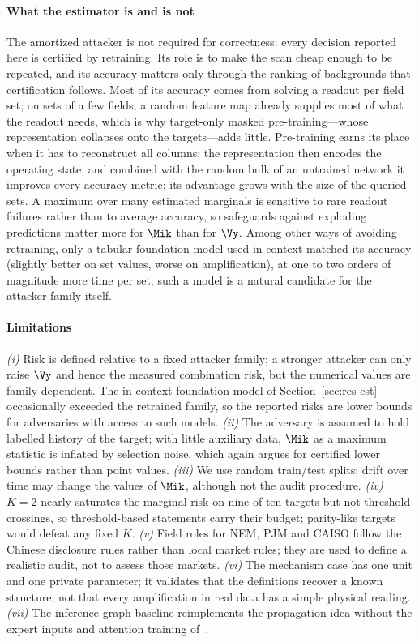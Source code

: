 \paragraph{What the estimator is and is not}
The amortized attacker is not required for correctness: every decision reported here is certified
by retraining. Its role is to make the scan cheap enough to be repeated, and its accuracy matters
only through the ranking of backgrounds that certification follows. Most of its accuracy comes from solving a readout
per field set; on sets of a few fields, a random feature map already supplies most of what the readout needs, which is
why target-only masked pre-training---whose representation collapses onto the targets---adds little. Pre-training
earns its place when it has to reconstruct all columns: the representation then encodes the operating state, and combined
with the random bulk of an untrained network it improves every accuracy metric; its advantage grows with the size of the
queried sets. A maximum over many
estimated marginals is sensitive to rare readout failures rather than to average accuracy, so safeguards against
exploding predictions matter more for $\Mik$ than for $\Vy$. Among other ways of avoiding retraining, only a tabular foundation model used in context
matched its accuracy (slightly better on set values, worse on amplification), at one to two orders of magnitude more time per set; such a model is a natural candidate for the
attacker family itself.

\paragraph{Limitations}
\emph{(i)} Risk is defined relative to a fixed attacker family; a stronger attacker can only raise
$\Vy$ and hence the measured combination risk, but the numerical values are family-dependent. The in-context foundation
model of Section~\ref{sec:res-est} occasionally exceeded the retrained family, so the reported risks are lower bounds for
adversaries with access to such models.
\emph{(ii)} The adversary is assumed to hold labelled history of the target; with little auxiliary
data, $\Mik$ as a maximum statistic is inflated by selection noise, which again argues for certified
lower bounds rather than point values. \emph{(iii)} We use random train/test splits; drift over time
may change the values of $\Mik$, although not the audit procedure. \emph{(iv)} $K=2$ nearly saturates the marginal risk on nine of ten targets but not threshold
crossings, so threshold-based statements carry their budget; parity-like targets would defeat any fixed $K$. \emph{(v)} Field roles for NEM, PJM and CAISO follow the Chinese disclosure rules rather
than local market rules; they are used to define a realistic audit, not to assess those markets.
\emph{(vi)} The mechanism case has one unit and one private parameter; it validates that the
definitions recover a known structure, not that every amplification in real data has a simple physical
reading. \emph{(vii)} The inference-graph baseline reimplements the propagation idea without the expert inputs
and attention training of~\cite{hu2026ignn}.

